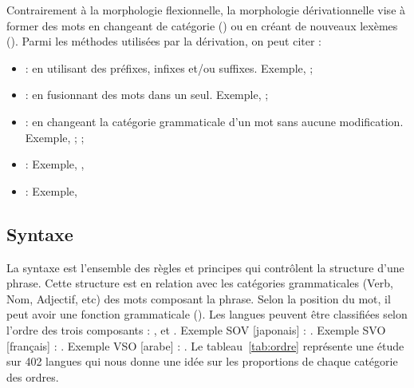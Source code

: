 \documentclass{KodeBook}
\begin{document}
Contrairement à la morphologie flexionnelle, la morphologie dérivationnelle vise à former des mots en changeant de catégorie () ou en créant de nouveaux lexèmes (). 
Parmi les méthodes utilisées par la dérivation, on peut citer :
\begin{itemize}
	\item {} : en utilisant des préfixes, infixes et/ou suffixes. 
	Exemple, ; 
	
	\item {} : en fusionnant des mots dans un seul. 
	Exemple, ; 
	
	\item {} : en changeant la catégorie grammaticale d'un mot sans aucune modification. 
	Exemple, ; ; 
	
	\item {} : 
	Exemple, , 
	
	\item {} : Exemple,  
	
\end{itemize}

\subsection{Syntaxe}

La syntaxe est l'ensemble des règles et principes qui contrôlent la structure d'une phrase. 
Cette structure est en relation avec les catégories grammaticales (Verb, Nom, Adjectif, etc) des mots composant la phrase.
Selon la position du mot, il peut avoir une fonction grammaticale ().
Les langues peuvent être classifiées selon l'ordre des trois composants : ,  et .
Exemple SOV [japonais] : .
Exemple SVO [français] : .
Exemple VSO [arabe] : .
Le tableau~\ref{tab:ordre} représente une étude sur 402 langues qui nous donne une idée sur les proportions de chaque catégorie des ordres.
\end{document}
